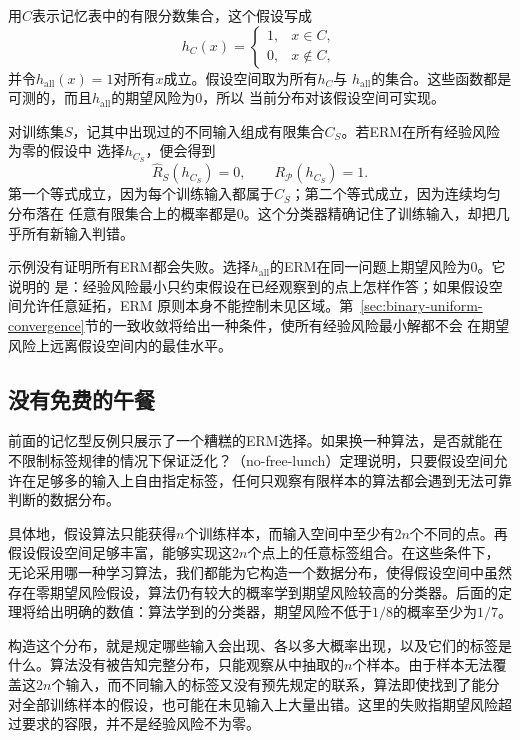用$C$表示记忆表中的有限分数集合，这个假设写成
\begin{equation}
  h_C(x)=
  \begin{cases}
    1, & x\in C,\\
    0, & x\notin C,
  \end{cases}
  \label{eq:finite-memory-classifier}
\end{equation}
并令$h_{\mathrm{all}}(x)=1$对所有$x$成立。假设空间取为所有$h_C$与
$h_{\mathrm{all}}$的集合。这些函数都是可测的，而且$h_{\mathrm{all}}$的期望风险为0，所以
当前分布对该假设空间可实现。

对训练集$S$，记其中出现过的不同输入组成有限集合$C_S$。若ERM在所有经验风险为零的假设中
选择$h_{C_S}$，便会得到
\begin{equation}
  \hat R_S(h_{C_S})=0,
  \qquad
  R_{\mathcal P}(h_{C_S})=1.
  \label{eq:memorization-erm-failure}
\end{equation}
第一个等式成立，因为每个训练输入都属于$C_S$；第二个等式成立，因为连续均匀分布落在
任意有限集合上的概率都是0。这个分类器精确记住了训练输入，却把几乎所有新输入判错。

示例没有证明所有ERM都会失败。选择$h_{\mathrm{all}}$的ERM在同一问题上期望风险为0。它说明的
是：经验风险最小只约束假设在已经观察到的点上怎样作答；如果假设空间允许任意延拓，ERM
原则本身不能控制未见区域。第~\ref{sec:binary-uniform-convergence}节的一致收敛将给出一种条件，使所有经验风险最小解都不会
在期望风险上远离假设空间内的最佳水平。

\subsection{没有免费的午餐}
\label{sec:no-free-lunch}

前面的记忆型反例只展示了一个糟糕的ERM选择。如果换一种算法，是否就能在不限制标签规律的情况下保证泛化？（no-free-lunch）定理说明，只要假设空间允许在足够多的输入上自由指定标签，任何只观察有限样本的算法都会遇到无法可靠判断的数据分布。

具体地，假设算法只能获得$n$个训练样本，而输入空间中至少有$2n$个不同的点。再假设假设空间足够丰富，能够实现这$2n$个点上的任意标签组合。在这些条件下，无论采用哪一种学习算法，我们都能为它构造一个数据分布，使得假设空间中虽然存在零期望风险假设，算法仍有较大的概率学到期望风险较高的分类器。后面的定理将给出明确的数值：算法学到的分类器，期望风险不低于$1/8$的概率至少为$1/7$。

构造这个分布，就是规定哪些输入会出现、各以多大概率出现，以及它们的标签是什么。算法没有被告知完整分布，只能观察从中抽取的$n$个样本。由于样本无法覆盖这$2n$个输入，而不同输入的标签又没有预先规定的联系，算法即使找到了能分对全部训练样本的假设，也可能在未见输入上大量出错。这里的失败指期望风险超过要求的容限，并不是经验风险不为零。

